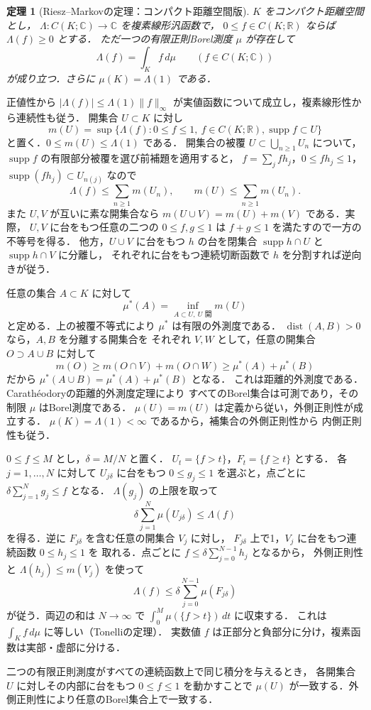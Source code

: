 \documentclass[a5paper,10pt,onecolumn]{jsarticle}
\makeatletter
\theoremstyle{mathnotetheorem}
\newtheorem{theorem}{定理}[section]
\renewcommand{\proofname}{証明}
\renewenvironment{proof}[1][\proofname]{%
  \par\pushQED{\qed}\normalfont\topsep4\p@\@plus2\p@\relax
  \trivlist\item[\hskip\labelsep\bfseries #1]\ignorespaces
}{\popQED\endtrivlist\@endpefalse}
\newcommand{\norm}[1]{\lVert #1\rVert}
\makeatother
\begin{document}
\begin{theorem}[Riesz--Markovの定理：コンパクト距離空間版]
$K$ をコンパクト距離空間とし，
$\Lambda:C(K;\mathbb C)\to\mathbb C$ を複素線形汎函数で，
$0\le f\in C(K;\mathbb R)$ ならば $\Lambda(f)\ge0$ とする．
ただ一つの有限正則Borel測度 $\mu$ が存在して
\[
  \Lambda(f)=\int_K f\,d\mu\qquad(f\in C(K;\mathbb C))
\]
が成り立つ．さらに $\mu(K)=\Lambda(1)$ である．
\end{theorem}
\begin{proof}
正値性から $|\Lambda(f)|\le\Lambda(1)\norm{f}_\infty$
が実値函数について成立し，複素線形性から連続性も従う．
開集合 $U\subset K$ に対し
\[
 m(U)=\sup\{\Lambda(f): 0\le f\le1,\ f\in C(K;\mathbb R),
                  \operatorname{supp}f\subset U\}
\]
と置く．$0\le m(U)\le\Lambda(1)$ である．
開集合の被覆 $U\subset\bigcup_{n\ge1}U_n$ について，
$\operatorname{supp}f$ の有限部分被覆を選び前補題を適用すると，
$f=\sum_jfh_j$，$0\le fh_j\le1$，
$\operatorname{supp}(fh_j)\subset U_{n(j)}$ なので
\[
 \Lambda(f)\le\sum_{n\ge1}m(U_n),\qquad
 m(U)\le\sum_{n\ge1}m(U_n).
\]
また $U,V$ が互いに素な開集合なら
$m(U\cup V)=m(U)+m(V)$ である．実際，
$U,V$ に台をもつ任意の二つの $0\le f,g\le1$ は
$f+g\le1$ を満たすので一方の不等号を得る．
他方，$U\cup V$ に台をもつ $h$ の台を閉集合
$\operatorname{supp}h\cap U$ と $\operatorname{supp}h\cap V$ に分離し，
それぞれに台をもつ連続切断函数で $h$ を分割すれば逆向きが従う．

任意の集合 $A\subset K$ に対して
\[
 \mu^*(A)=\inf_{A\subset U,\ U\text{ 開}}m(U)
\]
と定める．上の被覆不等式により $\mu^*$ は有限の外測度である．
$\operatorname{dist}(A,B)>0$ なら，$A,B$ を分離する開集合を
それぞれ $V,W$ として，任意の開集合 $O\supset A\cup B$ に対して
\[
 m(O)\ge m(O\cap V)+m(O\cap W)
       \ge\mu^*(A)+\mu^*(B)
\]
だから $\mu^*(A\cup B)=\mu^*(A)+\mu^*(B)$ となる．
これは距離的外測度である．Carath\'eodoryの距離的外測度定理により
すべてのBorel集合は可測であり，その制限 $\mu$ はBorel測度である．
$\mu(U)=m(U)$ は定義から従い，外側正則性が成立する．
$\mu(K)=\Lambda(1)<\infty$ であるから，補集合の外側正則性から
内側正則性も従う．

$0\le f\le M$ とし，$\delta=M/N$ と置く．
$U_t=\{f>t\}$，$F_t=\{f\ge t\}$ とする．
各 $j=1,\dots,N$ に対して $U_{j\delta}$ に台をもつ
$0\le g_j\le1$ を選ぶと，点ごとに
$\delta\sum_{j=1}^N g_j\le f$ となる．
$\Lambda(g_j)$ の上限を取って
\[
 \delta\sum_{j=1}^{N}\mu(U_{j\delta})\le\Lambda(f)
\]
を得る．逆に $F_{j\delta}$ を含む任意の開集合 $V_j$ に対し，
$F_{j\delta}$ 上で1，$V_j$ に台をもつ連続函数 $0\le h_j\le1$ を
取れる．点ごとに
$f\le\delta\sum_{j=0}^{N-1}h_j$ となるから，
外側正則性と $\Lambda(h_j)\le m(V_j)$ を使って
\[
 \Lambda(f)\le\delta\sum_{j=0}^{N-1}\mu(F_{j\delta})
\]
が従う．両辺の和は $N\to\infty$ で
$\int_0^M\mu(\{f>t\})\,dt$ に収束する．
これは $\int_K f\,d\mu$ に等しい（Tonelliの定理）．
実数値 $f$ は正部分と負部分に分け，複素函数は実部・虚部に分ける．

二つの有限正則測度がすべての連続函数上で同じ積分を与えるとき，
各開集合 $U$ に対しその内部に台をもつ $0\le f\le1$ を動かすことで
$\mu(U)$ が一致する．外側正則性により任意のBorel集合上で一致する．
\end{proof}
\end{document}
